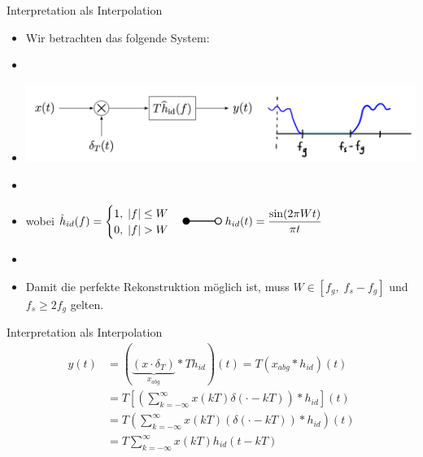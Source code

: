 \documentclass[14pt, aspectratio=169, handout]{beamer}
\newcommand{\invtransform}[2]{%
    \begin{tikzpicture}
        \filldraw[thick] (0,0) circle (0.1);
        \draw[thick] (0.1,0) -- (#2 -0.1,0) node[midway, above] {#1};
        \draw[thick] (#2,0) circle (0.1);
    \end{tikzpicture}%
}
\begin{document}
\begin{frame}{Interpretation als Interpolation}
    \begin{itemize}
    \item Wir betrachten das folgende System:
    \item[] 
    \item[] \begin{center}
        \includegraphics[width=0.9\linewidth]{figures/filtering2.jpg}
    \end{center}
    \item[] 
    \item[] wobei $\hat{h}_{id}(f) = \displaystyle\begin{cases}
        1, \; |f| \leq W \\
        0, \; |f| > W
    \end{cases} \invtransform{}{1} \; h_{id}(t)=\displaystyle\frac{\sin(2 \pi W t)}{\pi t}$
    \item[] 
    \item Damit die perfekte Rekonstruktion möglich ist, muss $W \in [f_g, \; f_s -f_g]$ und $f_s \geq 2f_g$ gelten.
    \end{itemize}
\end{frame}

\begin{frame}{Interpretation als Interpolation}
    \vspace*{-0.5cm}
    \begin{align*}
        y(t) &= \left(\underbrace{(x \cdot \delta_T)}_{x_{abg}} \ast T h_{id}\right)(t) = T (x_{abg} \ast h_{id})(t) \\
        &= T \left[ \left( \sum_{k = -\infty}^{\infty} x(kT) \delta(\cdot -kT) \right)  \ast h_{id} \right](t) \\
        &= T \left( \sum_{k = -\infty}^{\infty} x(kT) \left(\delta(\cdot -kT) \right)  \ast h_{id}\right) (t) \\
        &= T \sum_{k = -\infty}^{\infty} x(kT) h_{id}(t-kT)
    \end{align*}
\end{frame}
\end{document}
